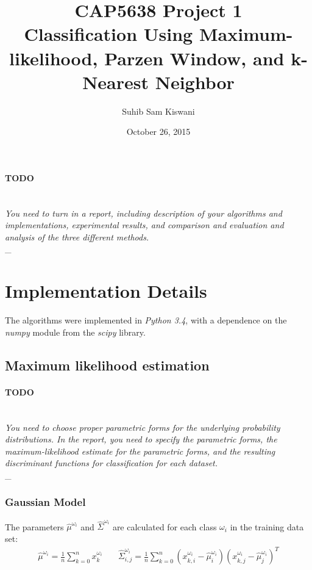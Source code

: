 \documentclass{article}
\title{
    CAP5638 Project 1\\
    \large Classification Using Maximum-likelihood, Parzen Window, and k-Nearest Neighbor
}
\author{Suhib Sam Kiswani}
\date{October 26, 2015}
\newcommand{\wi}{\omega_i}
\newcommand{\hsigma}{\widehat \Sigma}
\newcommand{\hmu}{\hat \mu}
\newcommand{\outline}[2]{\paragraph{\textsc{#1}}\hrulefill~\\{\small\it #2}\\\_\hrulefill~\\}
\newcommand{\todo}[1]{\outline{\large TODO}{#1}}
\begin{document}
\maketitle

\todo{You need to turn in a report, including description of your algorithms and implementations,
experimental results, and comparison and evaluation and analysis of the three different methods.}


\section{Implementation Details}

The algorithms were implemented in {\it Python 3.4}, with a dependence on the \textit{numpy} module from the \textit{scipy} \cite{sp} library.


\subsection{Maximum likelihood estimation}
\todo{You need to choose proper parametric forms for the underlying probability distributions. In the report, you need to specify the parametric forms, the maximum-likelihood estimate for the parametric forms, and the resulting discriminant functions for classification for each dataset.}

\subsubsection{Gaussian Model}
The parameters $\hmu^{\wi}$ and $\hsigma^{\wi}$ are calculated for each class $\wi$ in the training data set:
\begin{align*}
\hmu^{\wi} = \frac{1}{n} \sum^n_{k=0} x^{\wi}_{k} &
~&
\hsigma^{\wi}_{i,j} = \frac{1}{n} \sum^n_{k=0}
    \left(x^{\wi}_{k,i} - \hmu^{\wi}_i \right)
    \left(x^{\wi}_{k,j} - \hmu^{\wi}_j \right)^T
\end{align*}
\end{document}
